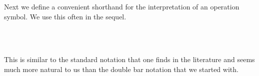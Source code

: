 \documentclass[a4paper,UKenglish,cleveref,autoref,thm-restate,11pt]{lipics-v2021}
\begin{document}
Next we define a convenient shorthand for the interpretation of an operation symbol. We use this often in the sequel.
\ccpad
\begin{code}%
\>[0][@{}l@{\AgdaIndent{1}}]%
\>[1]\AgdaSpace{}%
\AgdaSymbol{:}\AgdaSpace{}%
\AgdaSymbol{(}\AgdaSpace{}%
\AgdaSymbol{:}\AgdaSpace{}%
\AgdaSpace{}%
\AgdaSpace{}%
\AgdaSymbol{)(}\AgdaSpace{}%
\AgdaSymbol{:}\AgdaSpace{}%
\AgdaSpace{}%
\AgdaSpace{}%
\AgdaSymbol{)}\AgdaSpace{}%
\AgdaSpace{}%
\AgdaSymbol{(}\AgdaSpace{}%
\AgdaSpace{}%
\AgdaSpace{}%
%
\>[48]%
\>[51]\AgdaSpace{}%
\AgdaSpace{}%
\AgdaSymbol{)}\AgdaSpace{}%
\AgdaSpace{}%
\AgdaSpace{}%
\AgdaSpace{}%
\<%
\\
%
\\[\AgdaEmptyExtraSkip]%
%
\>[1]\AgdaSpace{}%
\AgdaSpace{}%
\AgdaSpace{}%
\AgdaSymbol{=}\AgdaSpace{}%
\AgdaSpace{}%
\AgdaSpace{}%
\AgdaSpace{}%
\AgdaSymbol{(}\AgdaSpace{}%
\AgdaSpace{}%
\AgdaSpace{}%
\AgdaSymbol{)}\AgdaSpace{}%
\<%
\end{code}
\ccpad
This is similar to the standard notation that one finds in the literature and seems much more natural to us than the double bar notation that we started with.
\end{document}
